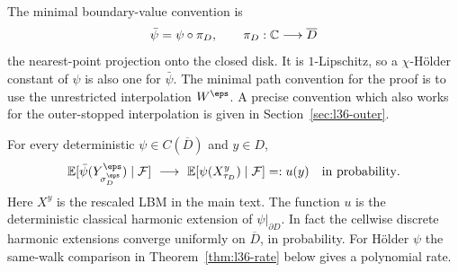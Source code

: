 The minimal boundary-value convention is
\[
 \bar\psi=\psi\circ\pi_D,\qquad
 \pi_D:\mathbb{C}\longrightarrow\overline D
\]
the nearest-point projection onto the closed disk.
It is $1$-Lipschitz, so a $\chi$-H\"older constant of $\psi$ is also
one for $\bar\psi$. The minimal path convention for the proof is to
use the unrestricted interpolation $W^\eps$. A precise convention
which also works for the outer-stopped interpolation is
given in Section~\ref{sec:l36-outer}.

\begin{theorem}\label{thm:l36-A}
For every deterministic $\psi\in C(\overline D)$ and $y\in D$,
\begin{equation}\label{eq:l36-main}
 \mathbb{E}[\bar\psi(Y^\eps_{\sigma^\eps_D})\mid\mathcal F]
 \ \longrightarrow\
 \mathbb{E}[\psi(X^y_{\tau_D})\mid\mathcal F]
 =:u(y)
 \quad\text{in probability}.
\end{equation}
Here $X^y$ is the rescaled LBM in the main text. The function $u$ is
the deterministic classical harmonic extension of
$\psi|_{\partial D}$. In fact the cellwise discrete harmonic
extensions converge uniformly on $\overline D$, in probability.
For H\"older $\psi$ the same-walk comparison in
Theorem~\ref{thm:l36-rate} below gives a polynomial rate.
\end{theorem}

